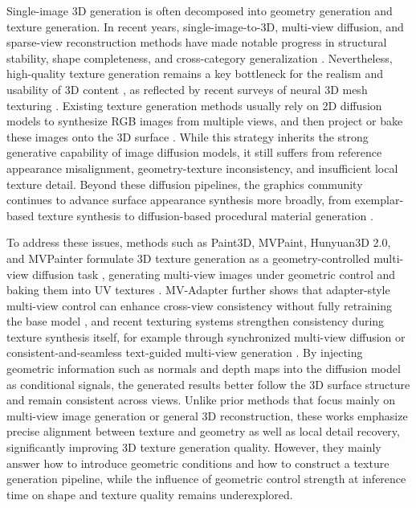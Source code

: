 \documentclass[times,twocolumn,final]{elsarticle}
\providecommand{\DIFadd}[1]{{\protect\color{blue} \sf #1}} %
\providecommand{\DIFaddbegin}{} %
\providecommand{\DIFaddend}{} %
\newcommand{\DIFaddincludegraphics}[2][]{{\color{blue}\fbox{\DIFOincludegraphics[#1]{#2}}}} %
\DeclareRobustCommand{\DIFaddbegin}{\DIFOaddbegin \let\includegraphics\DIFaddincludegraphics} %
\DeclareRobustCommand{\DIFaddend}{\DIFOaddend \let\includegraphics\DIFOincludegraphics} %
\begin{document}
Single-image 3D generation is often decomposed into geometry generation and texture generation. In recent years, single-image-to-3D, multi-view diffusion, and sparse-view reconstruction methods have made notable progress in structural stability, shape completeness, and cross-category generalization \cite{liu2023zero1to3,shi2023zero123pp,liu2023syncdreamer,long2023wonder3d,shi2024mvdream,wang2023imagedream,xu2024instantmesh,ke2024era3d}. Nevertheless, high-quality texture generation remains a key bottleneck for the realism and usability of 3D content\DIFaddbegin \DIFadd{, as reflected by recent surveys of neural 3D mesh texturing \cite{perla2026survey}}\DIFaddend . Existing texture generation methods usually rely on 2D diffusion models to synthesize RGB images from multiple views, and then project or bake these images onto the 3D surface \cite{chen2023text2tex,richardson2023texture,poole2023dreamfusion,chen2023fantasia3d}. While this strategy inherits the strong generative capability of image diffusion models, it still suffers from reference appearance misalignment, geometry-texture inconsistency, and insufficient local texture detail. \DIFaddbegin \DIFadd{Beyond these diffusion pipelines, the graphics community continues to advance surface appearance synthesis more broadly, from exemplar-based texture synthesis \cite{guzman2026adaptive} to diffusion-based procedural material generation \cite{lv2025interpretable}.
}\DIFaddend

To address these issues, methods such as \DIFaddbegin \DIFadd{Paint3D, MVPaint, Hunyuan3D 2.0, and }\DIFaddend MVPainter formulate 3D texture generation as a geometry-controlled multi-view diffusion task  \DIFaddbegin \DIFadd{, generating multi-view images under geometric control and baking them into UV textures \cite{zeng2024paint3d,cheng2024mvpaint,lai2025hunyuan3d,shao2025mvpainter}}\DIFaddend . MV-Adapter further shows that adapter-style multi-view control can enhance cross-view consistency without fully retraining the base model \cite{huang2024mvadapter}\DIFaddbegin \DIFadd{, and recent texturing systems strengthen consistency during texture synthesis itself, for example through synchronized multi-view diffusion \cite{liu2024synchronized} or consistent-and-seamless text-guided multi-view generation \cite{xu2026wondertex}}\DIFaddend . By injecting geometric information such as normals and depth maps into the diffusion model as conditional signals, the generated results better follow the 3D surface structure and remain consistent across views. Unlike prior methods that focus mainly on multi-view image generation or general 3D reconstruction, these works emphasize precise alignment between texture and geometry as well as local detail recovery, significantly improving 3D texture generation quality. However, they mainly answer how to introduce geometric conditions and how to construct a texture generation pipeline, while the influence of geometric control strength at inference time on shape and texture quality remains underexplored.
\end{document}
